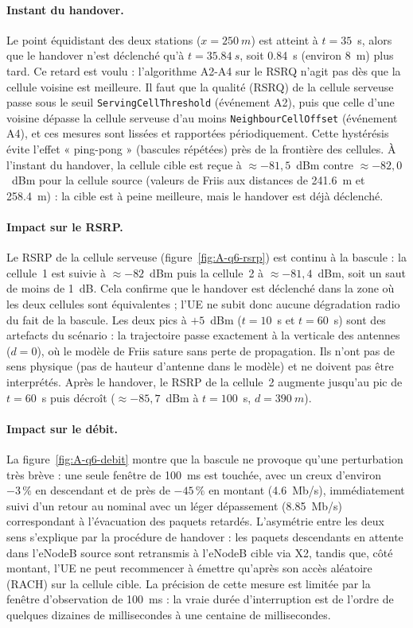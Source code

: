 \paragraph{Instant du handover.} Le point équidistant des deux stations
($x=\SI{250}{m}$) est atteint à $t=35$~s, alors que le handover n'est déclenché
qu'à $t=\SI{35.84}{s}$, soit \SI{0.84}{s} (environ \SI{8}{m}) plus tard. Ce
retard est voulu : l'algorithme A2-A4 sur le RSRQ n'agit pas dès que la cellule
voisine est meilleure. Il faut que la qualité (RSRQ) de la cellule serveuse
passe sous le seuil \texttt{ServingCellThreshold} (événement A2), puis que celle
d'une voisine dépasse la cellule serveuse d'au moins \texttt{NeighbourCellOffset}
(événement A4), et ces mesures sont lissées et rapportées périodiquement. Cette
hystérésis évite l'effet « ping-pong » (bascules répétées) près de la frontière
des cellules. À l'instant du handover, la cellule cible est reçue à
$\approx-81{,}5$~dBm contre $\approx-82{,}0$~dBm pour la cellule source (valeurs
de Friis aux distances de \SI{241.6}{m} et \SI{258.4}{m}) : la cible est à peine
meilleure, mais le handover est déjà déclenché.

\paragraph{Impact sur le RSRP.} Le RSRP de la cellule serveuse (figure~\ref{fig:A-q6-rsrp})
est continu à la bascule : la cellule~1 est suivie à $\approx-82$~dBm
puis la cellule~2 à $\approx-81{,}4$~dBm, soit un saut de moins de
\SI{1}{dB}. Cela confirme que le handover est déclenché dans la zone où les deux
cellules sont équivalentes ; l'UE ne subit donc aucune dégradation radio du fait
de la bascule. Les deux pics à $+5$~dBm ($t=10$~s et $t=60$~s) sont des
artefacts du scénario : la trajectoire passe exactement à la verticale des
antennes ($d=0$), où le modèle de Friis sature sans perte de propagation. Ils
n'ont pas de sens physique (pas de hauteur d'antenne dans le modèle) et ne
doivent pas être interprétés. Après le handover, le RSRP de la cellule~2 augmente
jusqu'au pic de $t=60$~s puis décroît ($\approx-85{,}7$~dBm à $t=100$~s,
$d=\SI{390}{m}$).

\paragraph{Impact sur le débit.} La figure~\ref{fig:A-q6-debit} montre que la
bascule ne provoque qu'une perturbation très brève : une seule fenêtre de
\SI{100}{ms} est touchée, avec un creux d'environ $-3\,\%$ en descendant et de
près de $-45\,\%$ en montant (\SI{4.6}{Mb/s}), immédiatement suivi d'un retour
au nominal avec un léger dépassement (\SI{8.85}{Mb/s}) correspondant à
l'évacuation des paquets retardés. L'asymétrie entre les deux sens s'explique
par la procédure de handover : les paquets descendants en attente dans
l'eNodeB source sont retransmis à l'eNodeB cible via X2, tandis que, côté
montant, l'UE ne peut recommencer à émettre qu'après son accès aléatoire (RACH)
sur la cellule cible. La précision de cette mesure est limitée par la fenêtre
d'observation de \SI{100}{ms} : la vraie durée d'interruption est de l'ordre de
quelques dizaines de millisecondes à une centaine de millisecondes.

